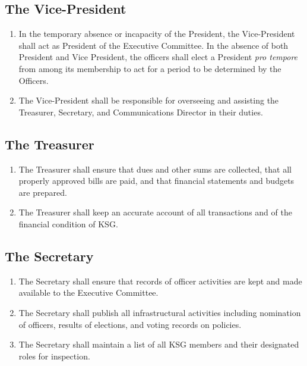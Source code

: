 \documentclass[12pt,executivepaper]{article}
\begin{document}
\subsection{The Vice-President}
\begin{enumerate}
    \item In the temporary absence or incapacity of the President, the Vice-President
          shall act as President of the Executive Committee. In the absence of both
          President and Vice President, the officers shall elect a President
          \textit{pro tempore} from among its membership to act for a period to be
          determined by the Officers.
    \item The Vice-President shall be responsible for overseeing and assisting
          the Treasurer, Secretary, and Communications Director in their
          duties.
\end{enumerate}

\subsection{The Treasurer}
\begin{enumerate}
    \item The Treasurer shall ensure that dues and other sums are collected, that all
          properly approved bills are paid, and that financial statements and budgets
          are prepared.
    \item The Treasurer shall keep an accurate account of all transactions and of the
          financial condition of KSG.
\end{enumerate}

\subsection{The Secretary}
\begin{enumerate}
    \item The Secretary shall ensure that records of officer activities are kept and made
          available to the Executive Committee.
    \item The Secretary shall publish all infrastructural activities including nomination
          of officers, results of elections, and voting records on policies.
    \item The Secretary shall maintain a list of all KSG members and their designated roles
          for inspection.
\end{enumerate}
\end{document}
